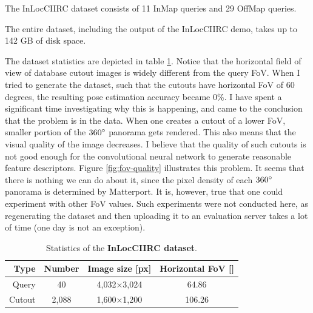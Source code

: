 \documentclass[twoside]{ctuthesis}
\theoremstyle{plain}
\theoremstyle{definition}
\theoremstyle{note}
\begin{document}
The InLocCIIRC dataset consists of 11 InMap queries and 29 OffMap queries.

The entire dataset, including the output of the InLocCIIRC demo, takes up to 142 GB of disk space.

The dataset statistics are depicted in table \ref{tab:dataset-statistics}. Notice that the horizontal field of view of database cutout images is widely different from the query FoV. When I tried to generate the dataset, such that the cutouts have horizontal FoV of 60 degrees, the resulting pose estimation accuracy became 0\%. I have spent a significant time investigating why this is happening, and came to the conclusion that the problem is in the data. When one creates a cutout of a lower FoV, smaller portion of the $360\degree$ panorama gets rendered. This also means that the visual quality of the image decreases. I believe that the quality of such cutouts is not good enough for the convolutional neural network to generate reasonable feature descriptors. Figure \ref{fig:fov-quality} illustrates this problem. It seems that there is nothing we can do about it, since the pixel density of each $360\degree$ panorama is determined by Matterport. It is, however, true that one could experiment with other FoV values. Such experiments were not conducted here, as regenerating the dataset and then uploading it to an evaluation server takes a lot of time (one day is not an exception).

\begin{table}[t]
    \centering
    {\footnotesize
	\begin{tabular}{|r||c|c|c|}
	\hline
	Type & Number & Image size [px] & Horizontal FoV [\degree] \\[1pt]
	\hline
    Query & 40 & 4,032$\times$3,024 & 64.86 \\[1pt]
	Cutout & 2,088 & 1,600$\times$1,200 & 106.26 \\[3pt]
	\hline
    \end{tabular}
	\caption{Statistics of the {\bf InLocCIIRC dataset}.}
	\label{tab:dataset-statistics}
    }
\end{table}
\end{document}
